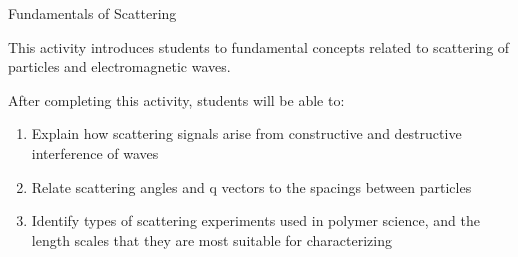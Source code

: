 %
%
%
%

\renewcommand{\figpath}{content/polymphys/scattering/scattering-fundamentals/figs}
\renewcommand{\labelbase}{scattering-fundamentals}

\begin{activity}{Fundamentals of Scattering}
\label{\labelbase}

\begin{instructornotes}
	This activity introduces students to fundamental concepts related to scattering of particles and electromagnetic waves.
	
	After completing this activity, students will be able to:
	\begin{enumerate}
		\item Explain how scattering signals arise from constructive and destructive interference of waves
		\item Relate scattering angles and q vectors to the spacings between particles
		\item Identify types of scattering experiments used in polymer science, and the length scales that they are most suitable for characterizing
	\end{enumerate}
	

\end{instructornotes}
\end{activity}
